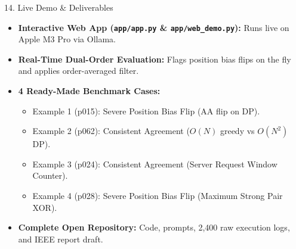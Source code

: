 \documentclass[aspectratio=169]{beamer}
\begin{document}
\begin{frame}{14. Live Demo \& Deliverables}
  \begin{itemize}
    \item \textbf{Interactive Web App (\texttt{app/app.py} \& \texttt{app/web_demo.py}):} Runs live on Apple M3 Pro via Ollama.
    \item \textbf{Real-Time Dual-Order Evaluation:} Flags position bias flips on the fly and applies order-averaged filter.
    \item \textbf{4 Ready-Made Benchmark Cases:}
      \begin{itemize}
        \item Example 1 (p015): Severe Position Bias Flip (AA flip on DP).
        \item Example 2 (p062): Consistent Agreement ($O(N)$ greedy vs $O(N^2)$ DP).
        \item Example 3 (p024): Consistent Agreement (Server Request Window Counter).
        \item Example 4 (p028): Severe Position Bias Flip (Maximum Strong Pair XOR).
      \end{itemize}
    \item \textbf{Complete Open Repository:} Code, prompts, 2,400 raw execution logs, and IEEE report draft.
  \end{itemize}
\end{frame}
\end{document}

